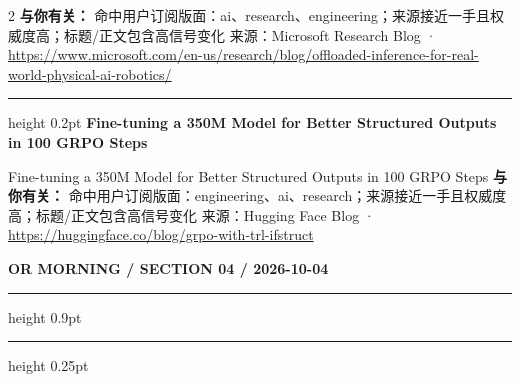 \documentclass[10.5pt]{ctexart}
\begin{document}
\begin{multicols}{2}
\textbf{与你有关：} 命中用户订阅版面：ai、research、engineering；来源接近一手且权威度高；标题/正文包含高信号变化
{\footnotesize\color{ormuted} 来源：Microsoft Research Blog · \url{https://www.microsoft.com/en-us/research/blog/offloaded-inference-for-real-world-physical-ai-robotics/}}
\vspace{2mm}
\hrule height 0.2pt
\vspace{2mm}
{\large\bfseries Fine-tuning a 350M Model for Better Structured Outputs in 100 GRPO Steps}\par
Fine-tuning a 350M Model for Better Structured Outputs in 100 GRPO Steps
\textbf{与你有关：} 命中用户订阅版面：engineering、ai、research；来源接近一手且权威度高；标题/正文包含高信号变化
{\footnotesize\color{ormuted} 来源：Hugging Face Blog · \url{https://huggingface.co/blog/grpo-with-trl-ifstruct}}
\end{multicols}
\newpage
{\small\bfseries OR MORNING / SECTION 04 / 2026-10-04}
\vspace{2mm}
\hrule height 0.9pt
\vspace{1.5mm}
\hrule height 0.25pt
\vspace{4mm}
\end{document}
